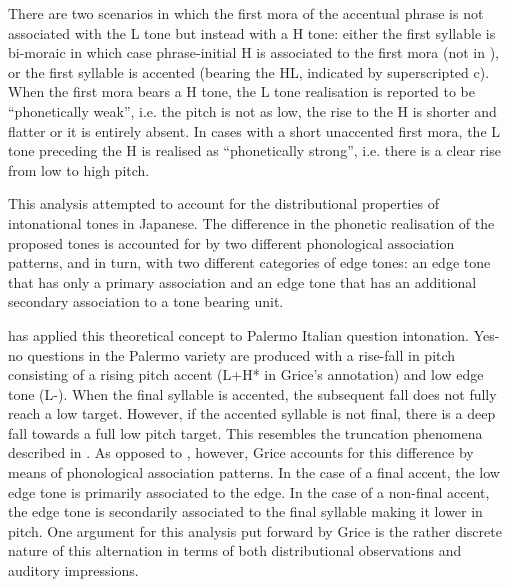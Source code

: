 There are two scenarios in which the first mora of the accentual phrase is not associated with the L tone but instead with a H tone: either the first syllable is bi-moraic in which case phrase-initial H is associated to the first mora (not in ), or the first syllable is accented (bearing the HL, indicated by superscripted c). When the first mora bears a H tone, the L tone realisation is reported to be “phonetically weak”, i.e. the pitch is not as low, the rise to the H is shorter and flatter or it is entirely absent. In cases with a short unaccented first mora, the L tone preceding the H is realised as “phonetically strong”, i.e. there is a clear rise from low to high pitch. 

\newpage 
This analysis attempted to account for the distributional properties of intonational tones in Japanese. The difference in the phonetic realisation of the proposed tones is accounted for by two different phonological association patterns, and in turn, with two different categories of edge tones: an edge tone that has only a primary association and an edge tone that has an additional secondary association to a tone bearing unit.

\citet{Grice1995} has applied this theoretical concept to Palermo Italian question intonation. Yes-no questions in the Palermo variety are produced with a rise-fall in pitch consisting of a rising pitch accent (L+H* in Grice’s annotation) and low edge tone (L-). When the final syllable is accented, the subsequent fall does not fully reach a low target. However, if the accented syllable is not final, there is a deep fall towards a full low pitch target. This resembles the truncation phenomena described in . As opposed to \citet{Grabe1998}, however, Grice accounts for this difference by means of phonological association patterns. In the case of a final accent, the low edge tone is primarily associated to the edge. In the case of a non-final accent, the edge tone is secondarily associated to the final syllable making it lower in pitch. One argument for this analysis put forward by Grice is the rather discrete nature of this alternation in terms of both distributional observations and auditory impressions.

